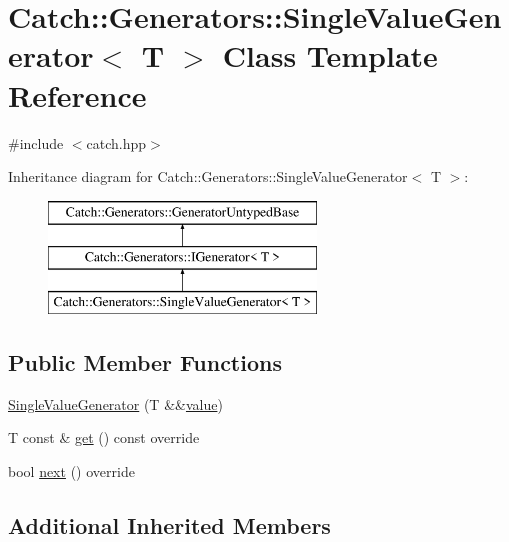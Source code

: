 \hypertarget{class_catch_1_1_generators_1_1_single_value_generator}{}\section{Catch\+:\+:Generators\+:\+:Single\+Value\+Generator$<$ T $>$ Class Template Reference}
\label{class_catch_1_1_generators_1_1_single_value_generator}


{\ttfamily \#include $<$catch.\+hpp$>$}

Inheritance diagram for Catch\+:\+:Generators\+:\+:Single\+Value\+Generator$<$ T $>$\+:\begin{figure}[H]
\begin{center}
\leavevmode
\includegraphics[height=3.000000cm]{class_catch_1_1_generators_1_1_single_value_generator}
\end{center}
\end{figure}
\subsection*{Public Member Functions}
\begin{DoxyCompactItemize}
\item 
\mbox{\hyperlink{class_catch_1_1_generators_1_1_single_value_generator_a532140dd2d1a673692271bb76a661ebe}{Single\+Value\+Generator}} (T \&\&\mbox{\hyperlink{namespace_catch_1_1_generators_a3c4989dd0dca44455f55484cedaa18da}{value}})
\item 
T const  \& \mbox{\hyperlink{class_catch_1_1_generators_1_1_single_value_generator_a5142058c52131a2471e7307972f99b50}{get}} () const override
\item 
bool \mbox{\hyperlink{class_catch_1_1_generators_1_1_single_value_generator_a10833b34e3ccbc484624185712eb8b6e}{next}} () override
\end{DoxyCompactItemize}
\subsection*{Additional Inherited Members}


